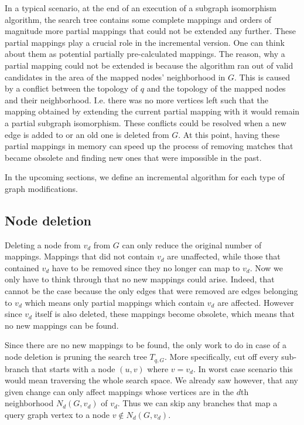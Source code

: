 In a typical scenario, at the end of an execution of a subgraph isomorphism algorithm,
the search tree contains some complete mappings and orders of magnitude more partial 
mappings that could not be extended any further. These partial mappings play a crucial 
role in the incremental version. One can think about them as potential partially 
pre-calculated mappings. The reason, why a partial mapping could not be extended is 
because the algorithm ran out of valid candidates in the area of the mapped nodes' 
neighborhood in \(G\). This is caused by a conflict between the topology of \(q\) and 
the topology of the mapped nodes and their neighborhood. I.e. there was no more vertices 
left such that the mapping obtained by extending the current partial mapping with it would 
remain a partial subgraph isomorphism. These conflicts could be resolved when a new edge is 
added to or an old one is deleted from \(G\). At this point, having these partial mappings 
in memory can speed up the process of removing  matches that became obsolete and finding new 
ones that were impossible in the past.

In the upcoming sections, we define an incremental algorithm for each type of graph 
modifications.

\subsection{Node deletion}

Deleting a node from $v_d$ from $G$ can only reduce the original number of mappings.
Mappings that did not contain $v_d$ are unaffected, while those that contained $v_d$ 
have to be removed since they no longer can map to $v_d$. Now we only have to think 
through that no new mappings could arise. Indeed, that cannot be the case because
the only edges that were removed are edges belonging to $v_d$ which means only 
partial mappings which contain $v_d$ are affected. However since $v_d$ itself is also
deleted, these mappings become obsolete, which means that no new mappings can be
found.

Since there are no new mappings to be found, the only work to do in case of a node
deletion is pruning the search tree $T_{q, G}$. More specifically, cut off every
sub-branch that starts with a node $(u, v)$ where $v = v_d$. In worst case scenario
this would mean traversing the whole search space. We already saw however, that any
given change can only affect mappings whose vertices are in the $d$th neighborhood
$N_d(G, v_d)$ of $v_d$. Thus we can skip any branches that map a query graph vertex
to a node $v \notin N_d(G, v_d)$.

